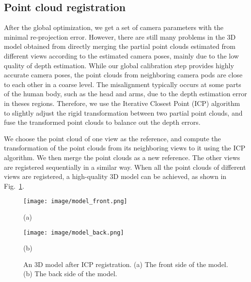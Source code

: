
\subsection{Point cloud registration}
\label{sec:registration}


After the global optimization, we get a set of camera parameters with the minimal re-projection error.
However, there are still many problems in the 3D model obtained from directly merging the partial point clouds estimated from different views according to the estimated camera poses, mainly due to the low quality of depth estimation.
%
%
While our global calibration step provides highly accurate camera poses, the point clouds from neighboring camera pods are close to each other in a coarse level.
The misalignment typically occurs at some parts of the human body, such as the head and arms, due to the depth estimation error in theses regions.
%
Therefore, we use the Iterative Closest Point (ICP) algorithm~\cite{Besl1992A} to slightly adjust the rigid transformation between two partial point clouds, and fuse the transformed point clouds to balance out the depth errors.
%

We choose the point cloud of one view as the reference, and compute the transformation of the point clouds from its neighboring views to it using the ICP algorithm. 
We then merge the point clouds as a new reference. 
The other views are registered sequentially in a similar way. 
When all the point clouds of different views are registered, a high-quality 3D model can be achieved, as shown in Fig.~\ref{fig:3Dmodel}.
\begin{figure}[ht]
%
\begin{minipage}[b]{.48\linewidth}
  \centering
\texttt{[image: image/model\_front.png]}
  \vspace{0cm}
  \centerline{(a)}\medskip
\end{minipage}
\hfill
\begin{minipage}[b]{0.48\linewidth}
  \centering
\texttt{[image: image/model\_back.png]}
  \vspace{0cm}
  \centerline{(b)}\medskip
\end{minipage}
%
\caption{An 3D model after ICP registration. (a) The front side of the model. (b) The back side of the model. }
\label{fig:3Dmodel}
\end{figure}


